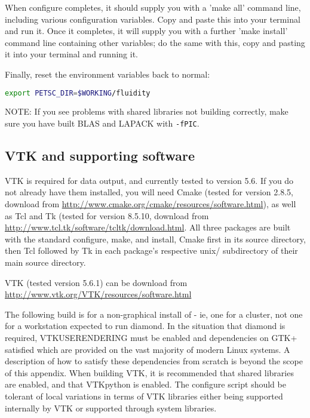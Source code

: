 When configure completes, it should supply you with a 'make all' command line,
including various configuration variables. Copy and paste this into your
terminal and run it. Once it completes, it will supply you with a further 'make
install' command line containing other variables; do the same with this, copy
and pasting it into your terminal and running it. 

Finally, reset the environment variables back to normal:

\begin{lstlisting}[language=bash]
export PETSC_DIR=$WORKING/fluidity
\end{lstlisting}

NOTE: If you see problems with shared libraries not building correctly, make
sure you have built BLAS and LAPACK with \lstinline[language=bash]+-fPIC+.

\subsection{VTK and supporting software}
\label{sec:required_libraries_vtk}

VTK is required for \fluidity data output, and currently tested to version 5.6.
If you do not already have them installed, you will need Cmake (tested for
version 2.8.5, download from
\url{http://www.cmake.org/cmake/resources/software.html}), as well as Tcl and
Tk (tested for version 8.5.10, download from
\url{http://www.tcl.tk/software/tcltk/download.html}. All three packages are
built with the standard configure, make, and install, Cmake first in its source
directory, then Tcl followed by Tk in each package's respective unix/
subdirectory of their main source directory.

VTK (tested version 5.6.1) can be download from
\url{http://www.vtk.org/VTK/resources/software.html}

The following build is for a non-graphical install of \fluidity - ie, one for a
cluster, not one for a workstation expected to run diamond. In the situation
that diamond is required, VTK{\textunderscore}USE{\textunderscore}RENDERING
must be enabled and dependencies on GTK+ satisfied which are provided on the
vast majority of modern Linux systems. A description of how to satisfy these
dependencies from scratch is beyond the scope of this appendix. When building
VTK, it is recommended that shared libraries are enabled, and that VTKpython is
enabled. The \fluidity configure script should be tolerant of local variations
in terms of VTK libraries either being supported internally by VTK or supported
through system libraries.

